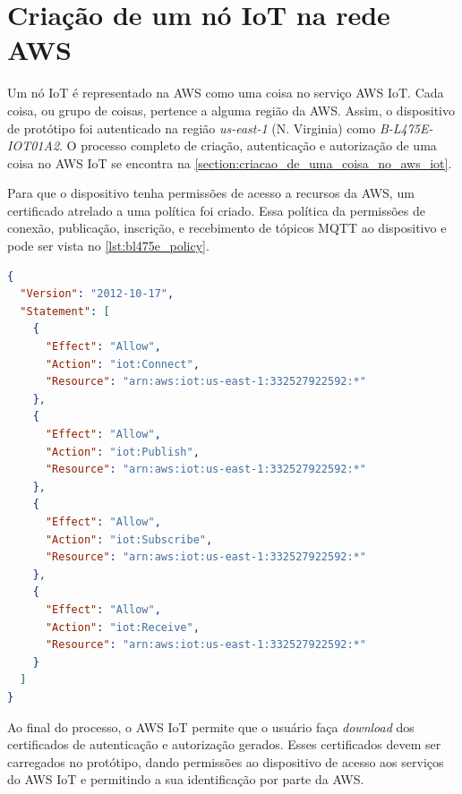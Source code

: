 \section{Criação de um nó IoT na rede AWS}\label{section:criacao_de_um_no_iot_na_rede_aws}

Um nó IoT é representado na AWS como uma coisa no serviço AWS IoT. Cada coisa, ou grupo de coisas, pertence a alguma região da AWS. Assim, o dispositivo de protótipo foi autenticado na região \textit{us-east-1} (N. Virginia) como \textit{B-L475E-IOT01A2}. O processo completo de criação, autenticação e autorização de uma coisa no AWS IoT se encontra na \autoref{section:criacao_de_uma_coisa_no_aws_iot}.

Para que o dispositivo tenha permissões de acesso a recursos da AWS, um certificado atrelado a uma política foi criado. Essa política da permissões de conexão, publicação, inscrição, e recebimento de tópicos MQTT ao dispositivo e pode ser vista no \autoref{lst:bl475e_policy}.

\begin{lstlisting}[float=htbp,language=json,firstnumber=1,caption={Política dando permissões de conexão, publicação, inscrição, e recebimento de tópicos MQTT ao dispositivo \textit{B-L475E-IOT01A2}.},label=lst:bl475e_policy]
{
  "Version": "2012-10-17",
  "Statement": [
    {
      "Effect": "Allow",
      "Action": "iot:Connect",
      "Resource": "arn:aws:iot:us-east-1:332527922592:*"
    },
    {
      "Effect": "Allow",
      "Action": "iot:Publish",
      "Resource": "arn:aws:iot:us-east-1:332527922592:*"
    },
    {
      "Effect": "Allow",
      "Action": "iot:Subscribe",
      "Resource": "arn:aws:iot:us-east-1:332527922592:*"
    },
    {
      "Effect": "Allow",
      "Action": "iot:Receive",
      "Resource": "arn:aws:iot:us-east-1:332527922592:*"
    }
  ]
}
\end{lstlisting}

Ao final do processo, o AWS IoT permite que o usuário faça \textit{download} dos certificados de autenticação e autorização gerados. Esses certificados devem ser carregados no protótipo, dando permissões ao dispositivo de acesso aos serviços do AWS IoT e permitindo a sua identificação por parte da AWS.

